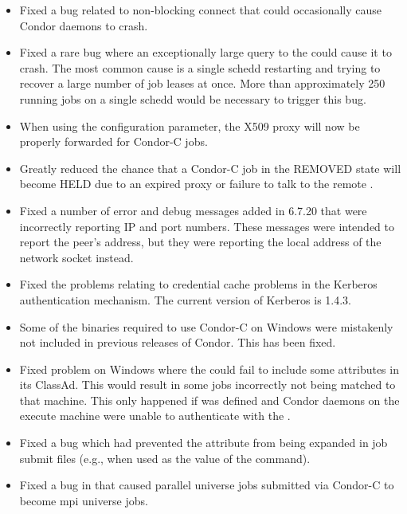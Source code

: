 \begin{itemize}
\item Fixed a bug related to non-blocking connect that could occasionally
cause Condor daemons to crash.

\item Fixed a rare bug where an exceptionally large query to the
 could cause it to crash.  The most common cause is a single
schedd restarting and trying to recover a large number of job leases at once.
More than approximately 250 running jobs on a single schedd would be necessary
to trigger this bug.

\item When using the  configuration
parameter, the X509 proxy will now be properly forwarded for Condor-C jobs.

\item Greatly reduced the chance that a Condor-C job in the REMOVED state
will become HELD due to an expired proxy or failure to talk to the remote
.

\item Fixed a number of error and debug messages added in 6.7.20 that
were incorrectly reporting IP and port numbers.  These messages were
intended to report the peer's address, but they were reporting the
local address of the network socket instead.

\item Fixed the problems relating to credential cache problems in the Kerberos
authentication mechanism.  The current version of Kerberos is 1.4.3.

\item Some of the binaries required to use Condor-C on Windows were
mistakenly not included in previous releases of Condor. This has been
fixed.

\item Fixed problem on Windows where the  could fail to
include some attributes in its ClassAd. This would result in some jobs
incorrectly not being matched to that machine.  This only happened if
 was defined and Condor daemons on the execute
machine were unable to authenticate with the .

\item Fixed a  bug which had prevented the
 attribute from being expanded in job submit files
(e.g., when used as the value of the  command).

\item Fixed a bug in  that caused parallel universe jobs
submitted via Condor-C to become mpi universe jobs.

\end{itemize}

